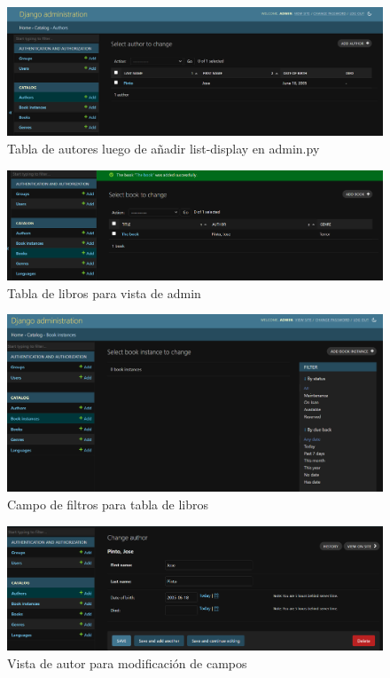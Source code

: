 \documentclass{article}
\begin{document}
    \begin{figure}[H]
        \centering
        \includegraphics[scale=0.42]{img/img4.png}
        \caption{Tabla de autores luego de añadir list-display en admin.py}
        \label{fig:imagen}
    \end{figure}

    \begin{figure}[H]
        \centering
        \includegraphics[scale=0.42]{img/img5.png}
        \caption{Tabla de libros para vista de admin}
        \label{fig:imagen}
    \end{figure}

    \begin{figure}[H]
        \centering
        \includegraphics[scale=0.42]{img/img6.png}
        \caption{Campo de filtros para tabla de libros}
        \label{fig:imagen}
    \end{figure}
    
    \begin{figure}[H]
        \centering
        \includegraphics[scale=0.42]{img/img7.png}
        \caption{Vista de autor para modificación de campos}
        \label{fig:imagen}
    \end{figure}
\end{document}
